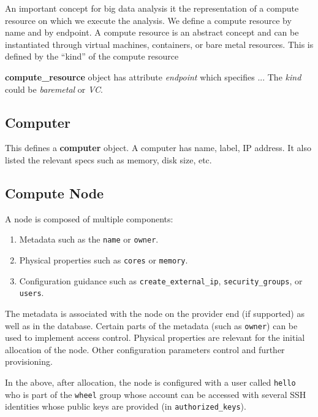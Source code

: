 \documentclass[9pt,twocolumn]{styles/osajnl}
\begin{document}
An important concept for big data analysis it the representation of a
compute resource on which we execute the analysis. We define a compute
resource by name and by endpoint. A compute resource is an abstract
concept and can be instantiated through virtual machines, containers,
or bare metal resources. This is defined by the “kind” of the compute
resource 

\textbf{compute\_resource} object has attribute \textit{endpoint} which
specifies ... The \textit{kind} could be \textit{baremetal} or \textit{VC}.


\subsection{Computer}

This defines a \textbf{computer} object. A computer has name, label,
IP address. It also listed the relevant specs such as memory, disk
size, etc.



\subsection{Compute Node}

A node is composed of multiple components:

\begin{enumerate}
\item Metadata such as the \verb|name| or \verb|owner|.
\item Physical properties such as \verb|cores| or \verb|memory|.
\item Configuration guidance such as \verb|create_external_ip|,
  \verb|security_groups|, or \verb|users|.
\end{enumerate}

The metadata is associated with the node on the provider end (if
supported) as well as in the database. Certain parts of the metadata
(such as \verb|owner|) can be used to implement access
control. Physical properties are relevant for the initial allocation
of the node. Other configuration parameters control and further
provisioning.

In the above, after allocation, the node is configured with a user
called \verb|hello| who is part of the \verb|wheel| group whose
account can be accessed with several SSH identities whose public keys
are provided (in \verb|authorized_keys|).
\end{document}

